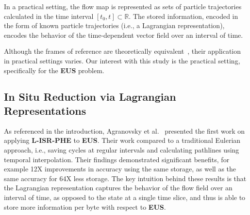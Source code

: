 In a practical setting, the flow map is represented as sets of particle trajectories calculated in the time interval $[t_0,t]\subset \mathbb R$.
%
The stored information, encoded in the form of known particle trajectories (i.e., a Lagrangian representation), encodes the behavior of the time-dependent vector field over an interval of time.
%

Although the frames of reference are theoretically equivalent~\cite{bujack2015lagrangian}, their application in practical settings varies. 
%
Our interest with this study is the practical setting, specifically for the \textbf{EUS} problem.
%


\subsection{In Situ Reduction via Lagrangian Representations}
As referenced in the introduction, Agranovsky et al.~\cite{agranovsky2014improved}
presented the first work on applying \textbf{L-ISR-PHE} to \textbf{EUS}.
%
Their work compared to a traditional Eulerian approach, i.e., saving cycles at regular
intervals and calculating pathlines using temporal interpolation.
%
Their findings demonstrated significant benefits, for example 12X improvements in accuracy
using the same storage, as well as the same accuracy for 64X less storage.
%
The key intuition behind these results is that the Lagrangian representation captures the
 behavior of the flow field over an interval of time, as opposed to the state at a single time slice, and 
thus is able to store more information per byte with respect to \textbf{EUS}.
%
%
%
%
%

